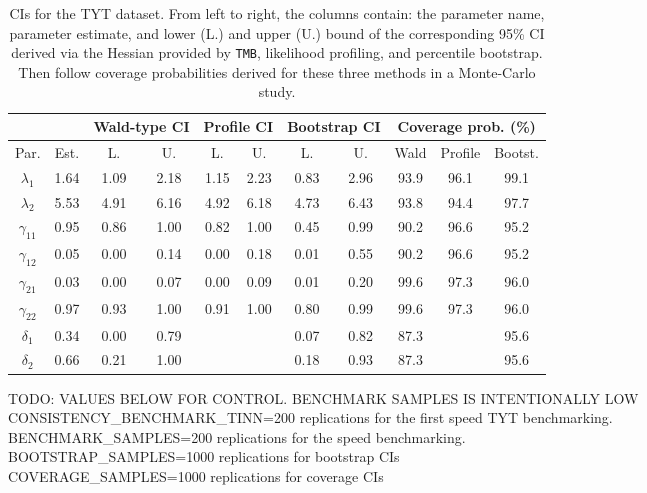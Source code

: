 \documentclass[bimj,fleqn]{w-art}\usepackage[]{graphicx}\usepackage[]{color}
\theoremstyle{plain}
\theoremstyle{definition}
\begin{document}
\begin{table}[ht]
\centering
\begin{tabular}{ccccccccccc}
  && \multicolumn{2}{c}{Wald-type CI}& \multicolumn{2}{c}{Profile CI}& \multicolumn{2}{c}{Bootstrap CI}& \multicolumn{3}{c}{Coverage prob. (\%)}\\ \hline
Par. & Est. & L. & U. & L. & U. & L. & U. & Wald & Profile & Bootst. \\ 
  \hline
$\lambda_{1}$ & 1.64 & 1.09 & 2.18 & 1.15 & 2.23 & 0.83 & 2.96 & 93.9 & 96.1 & 99.1 \\ 
  $\lambda_{2}$ & 5.53 & 4.91 & 6.16 & 4.92 & 6.18 & 4.73 & 6.43 & 93.8 & 94.4 & 97.7 \\ 
  $\gamma_{11}$ & 0.95 & 0.86 & 1.00 & 0.82 & 1.00 & 0.45 & 0.99 & 90.2 & 96.6 & 95.2 \\ 
  $\gamma_{12}$ & 0.05 & 0.00 & 0.14 & 0.00 & 0.18 & 0.01 & 0.55 & 90.2 & 96.6 & 95.2 \\ 
  $\gamma_{21}$ & 0.03 & 0.00 & 0.07 & 0.00 & 0.09 & 0.01 & 0.20 & 99.6 & 97.3 & 96.0 \\ 
  $\gamma_{22}$ & 0.97 & 0.93 & 1.00 & 0.91 & 1.00 & 0.80 & 0.99 & 99.6 & 97.3 & 96.0 \\ 
  $\delta_{1}$ & 0.34 & 0.00 & 0.79 &  &  & 0.07 & 0.82 & 87.3 &  & 95.6 \\ 
  $\delta_{2}$ & 0.66 & 0.21 & 1.00 &  &  & 0.18 & 0.93 & 87.3 &  & 95.6 \\ 
   \hline
\end{tabular}
\caption{CIs for the TYT dataset. From left to right, the columns contain: the parameter name, parameter estimate, and lower (L.) and upper (U.) bound of the corresponding 95\% CI derived via the Hessian provided by {\tt TMB}, likelihood profiling, and percentile bootstrap. Then follow coverage probabilities derived for these three methods in a Monte-Carlo study.} 
\label{table:tinn_cis}
\end{table}


TODO: VALUES BELOW FOR CONTROL. BENCHMARK SAMPLES IS INTENTIONALLY LOW\\[1ex]
CONSISTENCY\_BENCHMARK\_TINN=200 replications for the first speed TYT benchmarking.\\
BENCHMARK\_SAMPLES=200 replications for the speed benchmarking.\\
BOOTSTRAP\_SAMPLES=1000 replications for bootstrap CIs\\
COVERAGE\_SAMPLES=1000 replications for coverage CIs\\
\end{document}
